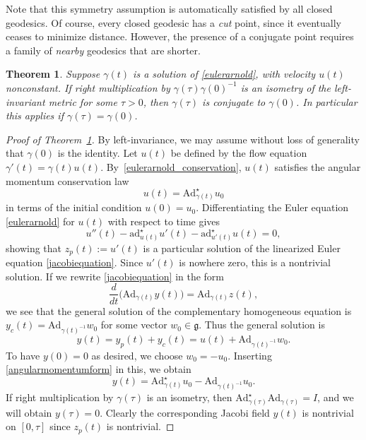 \documentclass[oneside, 11pt]{amsart}
\newtheorem{theorem}{Theorem}[section]
\numberwithin{equation}{section}
\newcommand{\ad}{\mathrm{ad}}
\newcommand{\Ad}{\mathrm{Ad}}
\newcommand{\Adstar}{\Ad^{\star}}
\newcommand{\adstar}{\ad^{\star}}
\begin{document}
Note that this symmetry assumption is automatically satisfied by all closed geodesics. Of course, every closed geodesic has a \emph{cut} point, since it eventually ceases to minimize distance. However, the presence of a conjugate point requires a family of \emph{nearby} geodesics that are shorter.
 

   


\begin{theorem}\label{closedgeodesicthm}
Suppose $\gamma(t)$ is a solution of \eqref{eulerarnold}, with velocity $u(t)$ nonconstant. If right multiplication by $\gamma(\tau)\gamma(0)^{-1}$ is an isometry of the left-invariant metric for some $\tau >0$, then $\gamma(\tau)$ is conjugate to $\gamma(0)$. In particular this applies if $\gamma(\tau)=\gamma(0)$.
\end{theorem}

\begin{proof}[Proof of Theorem~\ref{closedgeodesicthm}]
By left-invariance, we may assume without loss of generality that $\gamma(0)$ is the identity. Let $u(t)$ be defined by the flow equation $\gamma'(t) = \gamma(t)u(t)$. By~\eqref{eulerarnold_conservation}, $u(t)$ satisfies the angular momentum conservation law
\begin{equation}\label{angularmomentumform}
u(t) = \Adstar_{\gamma(t)}u_0
\end{equation}
in terms of the initial condition $u(0)=u_0$. Differentiating the Euler equation \eqref{eulerarnold} for $u(t)$ with respect to time gives 
$$ u''(t) - \adstar_{u(t)}u'(t) - \adstar_{u'(t)}u(t)=0,$$
showing that $z_p(t) := u'(t)$ is a particular solution of the linearized Euler equation \eqref{jacobiequation}.
Since $u'(t)$ is nowhere zero, this is a nontrivial solution. If we rewrite \eqref{jacobiequation} in the form 
$$ \frac{d}{dt}\Big( \Ad_{\gamma(t)}y(t)\Big) = \Ad_{\gamma(t)} z(t),$$
we see that the general solution of the complementary homogeneous equation is $y_c(t) = \Ad_{\gamma(t)^{-1}}w_0$ for some 
vector $w_0\in \mathfrak{g}$. Thus the general solution is 
$$ y(t) = y_p(t) + y_c(t) = u(t) + \Ad_{\gamma(t)^{-1}}w_0.$$
To have $y(0)=0$ as desired, we choose $w_0 = -u_0$. Inserting \eqref{angularmomentumform} in this, we obtain
\begin{equation*}%
y(t) = \Adstar_{\gamma(t)}u_0 - \Ad_{\gamma(t)^{-1}}u_0.
\end{equation*}
If right multiplication by $\gamma(\tau)$ is an isometry, then $\Adstar_{\gamma(\tau)}\Ad_{\gamma(\tau)}=I$,
and we will obtain $y(\tau)=0$. Clearly the corresponding Jacobi field $y(t)$ is nontrivial on $[0,\tau]$ since $z_p(t)$ is nontrivial.
\end{proof}
\end{document}
